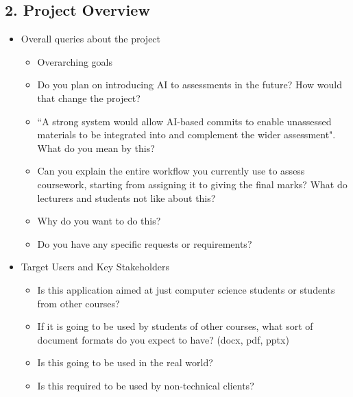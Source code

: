 \documentclass[11pt,a4paper]{article}
\begin{document}
\vspace{2em}

\subsection*{2. Project Overview \hfill}
\begin{itemize}[leftmargin=*]
    \item Overall queries about the project
    \begin{itemize}
        \item Overarching goals
        \item Do you plan on introducing AI to assessments in the future? How would that change the project?
        \item ``A strong system would allow AI-based commits to enable unassessed materials to be integrated into and complement the wider assessment". What do you mean by this?
        \item Can you explain the entire workflow you currently use to assess coursework, starting from assigning it to giving the final marks? What do lecturers and students not like about this?
        \item Why do you want to do this?
        \item Do you have any specific requests or requirements?
    \end{itemize}
    \item Target Users and Key Stakeholders
    \begin{itemize}
        \item Is this application aimed at just computer science students or students from other courses? 
        \item If it is going to be used by students of other courses, what sort of document formats do you expect to have? (docx, pdf, pptx)
        \item Is this going to be used in the real world?
        \item Is this required to be used by non-technical clients?
    \end{itemize}
\end{itemize}

\vspace{2em}
\end{document}
